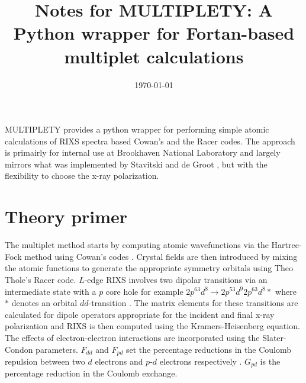 \documentclass[aps,onecolumn, notitlepage, longbibliography]{revtex4-1}
\begin{document}
\title{Notes for MULTIPLETY: A Python wrapper for Fortan-based multiplet calculations}




\def\mathbi#1{\ensuremath{\textbf{\em #1}}}
\def\Q{\ensuremath{\mathbi{Q}}}
\def\LNO{LaNiO$_3$}
\newcommand{\angstrom}{\mbox{\normalfont\AA}}
\date{\today}

%
\maketitle

MULTIPLETY provides a python wrapper for performing simple atomic calculations of RIXS spectra based Cowan's and the Racer codes. The approach is primairly for internal use at Brookhaven National Laboratory and largely mirrors what was implemented by Stavitski and de Groot \cite{Stavitski2010}, but with the flexibility to choose the x-ray polarization. 

\section{Theory primer}

The multiplet method starts by computing atomic wavefunctions via the Hartree-Fock method using Cowan's codes \cite{CowmanBook}. Crystal fields are then introduced by mixing the atomic functions to generate the appropriate symmetry orbitals using Theo Thole's Racer code. $L$-edge RIXS involves two dipolar transitions via an intermediate state with a $p$ core hole for example $2p^63d^8 \rightarrow 2p^53d^9  2p^63d^8*$ where $*$ denotes an orbital $dd$-transition \cite{Ament2011}. The matrix elements for these transitions are calculated for dipole operators appropriate for the incident and final x-ray polarization and RIXS is then computed using the Kramers-Heisenberg equation. The effects of electron-electron interactions are incorporated using the Slater-Condon parameters. $F_{dd}$ and $F_{pd}$ set the percentage reductions in the Coulomb repulsion between two $d$ electrons and $p$-$d$ electrons respectively \cite{deGrootBook, deGroot2005}. $G_{pd}$ is the percentage reduction in the Coulomb exchange. 
\end{document}
